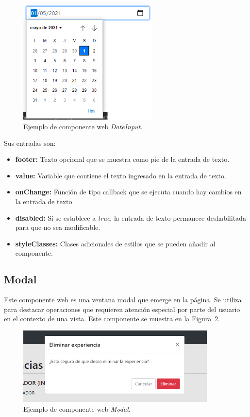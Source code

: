\documentclass[a4paper, 12pt]{book}
\begin{document}
    \begin{figure}
        \centering
        \includegraphics[width=7cm, keepaspectratio]{img/DateInput.PNG}
        \caption{Ejemplo de componente web \emph{DateInput}.}\label{fig:component_date_input}
    \end{figure}

    Sus entradas son:

    \begin{itemize}
        \item \textbf{footer:} Texto opcional que se muestra como pie de la entrada de texto.
        \item \textbf{value:} Variable que contiene el texto ingresado en la entrada de texto.
        \item \textbf{onChange:} Función de tipo callback que se ejecuta cuando hay cambios en la entrada de texto.
        \item \textbf{disabled:} Si se establece a \emph{true}, la entrada de texto permanece deshabilitada para que no sea modificable.
        \item \textbf{styleClasses:} Clases adicionales de estilos que se pueden añadir al componente.
    \end{itemize}

    \subsection{Modal}
    \label{subsec:wc_modal}
    Este componente web es una ventana modal que emerge en la página.
    Se utiliza para destacar operaciones que requieren atención especial por parte del usuario en el contexto de una vista.
    Este componente se muestra en la Figura~\ref{fig:component_modal}.

    \begin{figure}
        \centering
        \includegraphics[width=10cm, keepaspectratio]{img/Modal.PNG}
        \caption{Ejemplo de componente web \emph{Modal}.}\label{fig:component_modal}
    \end{figure}
\end{document}
